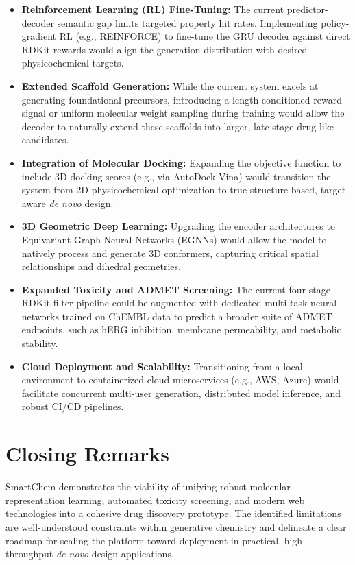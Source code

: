 \documentclass[12pt,a4paper]{report}
\begin{document}
\begin{itemize}
    \item \textbf{Reinforcement Learning (RL) Fine-Tuning:} The current predictor-decoder semantic gap limits targeted property hit rates. Implementing policy-gradient RL (e.g., REINFORCE) to fine-tune the GRU decoder against direct RDKit rewards would align the generation distribution with desired physicochemical targets.
    
    \item \textbf{Extended Scaffold Generation:} While the current system excels at generating foundational precursors, introducing a length-conditioned reward signal or uniform molecular weight sampling during training would allow the decoder to naturally extend these scaffolds into larger, late-stage drug-like candidates.
    
    \item \textbf{Integration of Molecular Docking:} Expanding the objective function to include 3D docking scores (e.g., via AutoDock Vina) would transition the system from 2D physicochemical optimization to true structure-based, target-aware \textit{de novo} design.
    
    \item \textbf{3D Geometric Deep Learning:} Upgrading the encoder architectures to Equivariant Graph Neural Networks (EGNNs) would allow the model to natively process and generate 3D conformers, capturing critical spatial relationships and dihedral geometries.
    
    \item \textbf{Expanded Toxicity and ADMET Screening:} The current four-stage RDKit filter pipeline could be augmented with dedicated multi-task neural networks trained on ChEMBL data to predict a broader suite of ADMET endpoints, such as hERG inhibition, membrane permeability, and metabolic stability.
    
    \item \textbf{Cloud Deployment and Scalability:} Transitioning from a local environment to containerized cloud microservices (e.g., AWS, Azure) would facilitate concurrent multi-user generation, distributed model inference, and robust CI/CD pipelines.
\end{itemize}

\section{Closing Remarks}

SmartChem demonstrates the viability of unifying robust molecular representation learning, automated toxicity screening, and modern web technologies into a cohesive drug discovery prototype. The identified limitations are well-understood constraints within generative chemistry and delineate a clear roadmap for scaling the platform toward deployment in practical, high-throughput \textit{de novo} design applications.
\end{document}
